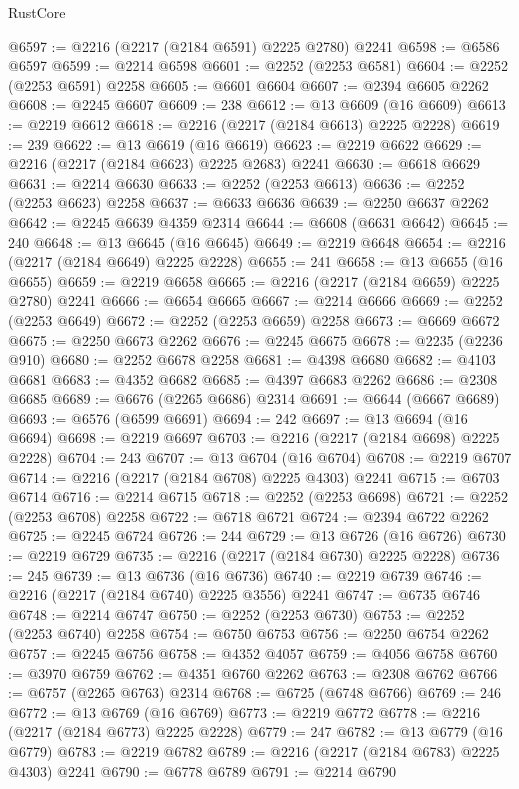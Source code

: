 \begin{lexlean}{RustCore}
\begin{coremodule}
@6597 := @2216 (@2217 (@2184 @6591) @2225 @2780) @2241
@6598 := @6586 @6597
@6599 := @2214 @6598
@6601 := @2252 (@2253 @6581)
@6604 := @2252 (@2253 @6591) @2258
@6605 := @6601 @6604
@6607 := @2394 @6605 @2262
@6608 := @2245 @6607
@6609 := 238
@6612 := @13 @6609 (@16 @6609)
@6613 := @2219 @6612
@6618 := @2216 (@2217 (@2184 @6613) @2225 @2228)
@6619 := 239
@6622 := @13 @6619 (@16 @6619)
@6623 := @2219 @6622
@6629 := @2216 (@2217 (@2184 @6623) @2225 @2683) @2241
@6630 := @6618 @6629
@6631 := @2214 @6630
@6633 := @2252 (@2253 @6613)
@6636 := @2252 (@2253 @6623) @2258
@6637 := @6633 @6636
@6639 := @2250 @6637 @2262
@6642 := @2245 @6639 @4359 @2314
@6644 := @6608 (@6631 @6642)
@6645 := 240
@6648 := @13 @6645 (@16 @6645)
@6649 := @2219 @6648
@6654 := @2216 (@2217 (@2184 @6649) @2225 @2228)
@6655 := 241
@6658 := @13 @6655 (@16 @6655)
@6659 := @2219 @6658
@6665 := @2216 (@2217 (@2184 @6659) @2225 @2780) @2241
@6666 := @6654 @6665
@6667 := @2214 @6666
@6669 := @2252 (@2253 @6649)
@6672 := @2252 (@2253 @6659) @2258
@6673 := @6669 @6672
@6675 := @2250 @6673 @2262
@6676 := @2245 @6675
@6678 := @2235 (@2236 @910)
@6680 := @2252 @6678 @2258
@6681 := @4398 @6680
@6682 := @4103 @6681
@6683 := @4352 @6682
@6685 := @4397 @6683 @2262
@6686 := @2308 @6685
@6689 := @6676 (@2265 @6686) @2314
@6691 := @6644 (@6667 @6689)
@6693 := @6576 (@6599 @6691)
@6694 := 242
@6697 := @13 @6694 (@16 @6694)
@6698 := @2219 @6697
@6703 := @2216 (@2217 (@2184 @6698) @2225 @2228)
@6704 := 243
@6707 := @13 @6704 (@16 @6704)
@6708 := @2219 @6707
@6714 := @2216 (@2217 (@2184 @6708) @2225 @4303) @2241
@6715 := @6703 @6714
@6716 := @2214 @6715
@6718 := @2252 (@2253 @6698)
@6721 := @2252 (@2253 @6708) @2258
@6722 := @6718 @6721
@6724 := @2394 @6722 @2262
@6725 := @2245 @6724
@6726 := 244
@6729 := @13 @6726 (@16 @6726)
@6730 := @2219 @6729
@6735 := @2216 (@2217 (@2184 @6730) @2225 @2228)
@6736 := 245
@6739 := @13 @6736 (@16 @6736)
@6740 := @2219 @6739
@6746 := @2216 (@2217 (@2184 @6740) @2225 @3556) @2241
@6747 := @6735 @6746
@6748 := @2214 @6747
@6750 := @2252 (@2253 @6730)
@6753 := @2252 (@2253 @6740) @2258
@6754 := @6750 @6753
@6756 := @2250 @6754 @2262
@6757 := @2245 @6756
@6758 := @4352 @4057
@6759 := @4056 @6758
@6760 := @3970 @6759
@6762 := @4351 @6760 @2262
@6763 := @2308 @6762
@6766 := @6757 (@2265 @6763) @2314
@6768 := @6725 (@6748 @6766)
@6769 := 246
@6772 := @13 @6769 (@16 @6769)
@6773 := @2219 @6772
@6778 := @2216 (@2217 (@2184 @6773) @2225 @2228)
@6779 := 247
@6782 := @13 @6779 (@16 @6779)
@6783 := @2219 @6782
@6789 := @2216 (@2217 (@2184 @6783) @2225 @4303) @2241
@6790 := @6778 @6789
@6791 := @2214 @6790

\end{coremodule}
\end{lexlean}
